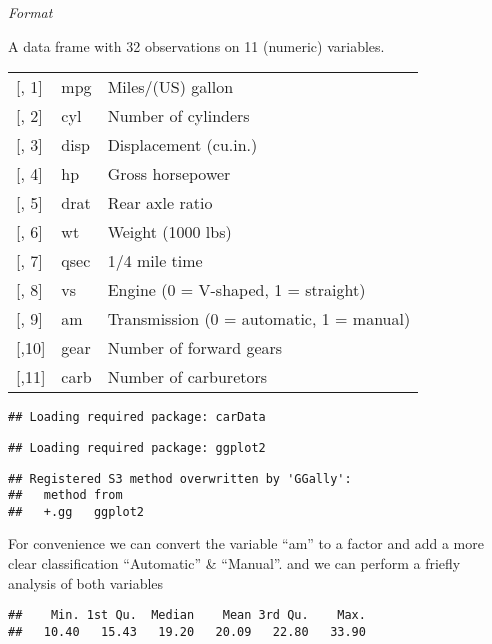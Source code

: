 \documentclass[]{article}
\newenvironment{Shaded}{\begin{snugshade}}{\end{snugshade}}
\newcommand{\KeywordTok}[1]{\textcolor[rgb]{0.13,0.29,0.53}{\textbf{#1}}}
\newcommand{\StringTok}[1]{\textcolor[rgb]{0.31,0.60,0.02}{#1}}
\newcommand{\OperatorTok}[1]{\textcolor[rgb]{0.81,0.36,0.00}{\textbf{#1}}}
\newcommand{\NormalTok}[1]{#1}
\begin{document}
\emph{Format}

A data frame with 32 observations on 11 (numeric) variables.

\begin{longtable}[]{@{}lll@{}}
\toprule
{[}, 1{]} & mpg & Miles/(US) gallon\tabularnewline
{[}, 2{]} & cyl & Number of cylinders\tabularnewline
{[}, 3{]} & disp & Displacement (cu.in.)\tabularnewline
{[}, 4{]} & hp & Gross horsepower\tabularnewline
{[}, 5{]} & drat & Rear axle ratio\tabularnewline
{[}, 6{]} & wt & Weight (1000 lbs)\tabularnewline
{[}, 7{]} & qsec & 1/4 mile time\tabularnewline
{[}, 8{]} & vs & Engine (0 = V-shaped, 1 = straight)\tabularnewline
{[}, 9{]} & am & Transmission (0 = automatic, 1 = manual)\tabularnewline
{[},10{]} & gear & Number of forward gears\tabularnewline
{[},11{]} & carb & Number of carburetors\tabularnewline
\bottomrule
\end{longtable}

\begin{verbatim}
## Loading required package: carData
\end{verbatim}

\begin{verbatim}
## Loading required package: ggplot2
\end{verbatim}

\begin{verbatim}
## Registered S3 method overwritten by 'GGally':
##   method from   
##   +.gg   ggplot2
\end{verbatim}

For convenience we can convert the variable ``am'' to a factor and add a
more clear classification ``Automatic'' \& ``Manual''. and we can
perform a friefly analysis of both variables

\begin{Shaded}
\end{Shaded}

\begin{verbatim}
##    Min. 1st Qu.  Median    Mean 3rd Qu.    Max. 
##   10.40   15.43   19.20   20.09   22.80   33.90
\end{verbatim}
\end{document}
